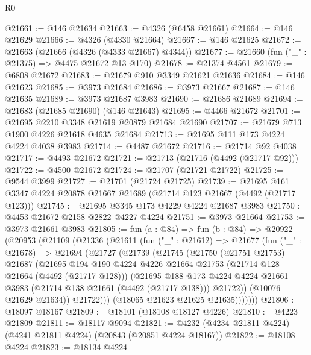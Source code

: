 \begin{lexlean}{R0}
\begin{coremodule}
@21661 := @146 @21634
@21663 := @4326 (@6458 @21661)
@21664 := @146 @21629
@21666 := @4326 (@4330 @21664)
@21667 := @146 @21625
@21672 := @21663 (@21666 (@4326 (@4333 @21667) @4344))
@21677 := @21660 (fun ("_" : @21375) => @4475 @21672 @13 @170)
@21678 := @21374 @4561
@21679 := @6808 @21672
@21683 := @21679 @910 @3349 @21621 @21636
@21684 := @146 @21623
@21685 := @3973 @21684
@21686 := @3973 @21667
@21687 := @146 @21635
@21689 := @3973 @21687 @3983
@21690 := @21686 @21689
@21694 := @21683 (@21685 @21690) (@146 @21643)
@21695 := @4466 @21672
@21701 := @21695 @2210 @3348 @21619 @20879 @21684 @21690
@21707 := @21679 @713 @1900 @4226 @21618 @4635 @21684
@21713 := @21695 @111 @173 @4224 @4224 @4038 @3983
@21714 := @4487 @21672
@21716 := @21714 @92 @4038
@21717 := @4493 @21672
@21721 := @21713 (@21716 (@4492 (@21717 @92)))
@21722 := @4500 @21672
@21724 := @21707 (@21721 @21722)
@21725 := @9544 @3999
@21727 := @21701 (@21724 @21725)
@21739 := @21695 @161 @3347 @4224 @20878 @21667 @21689 (@21714 @123 @21667 (@4492 (@21717 @123)))
@21745 := @21695 @3345 @173 @4229 @4224 @21687 @3983
@21750 := @4453 @21672 @2158 @2822 @4227 @4224
@21751 := @3973 @21664
@21753 := @3973 @21661 @3983
@21805 := fun (a : @84) =>
  fun (b : @84) =>
  @20922
    (@20953
      (@21109
        (@21336
          (@21611
            (fun ("_" : @21612) =>
            @21677
              (fun ("_" : @21678) =>
              @21694
                (@21727
                  (@21739
                    (@21745
                      (@21750
                        (@21751 @21753)
                        @21687
                        (@21695
                          @194
                          @190
                          @4224
                          @4226
                          @21664
                          @21753
                          (@21714 @128 @21664 (@4492 (@21717 @128)))
                          (@21695
                            @188
                            @173
                            @4224
                            @4224
                            @21661
                            @3983
                            (@21714 @138 @21661 (@4492 (@21717 @138)))
                            @21722))
                        (@10076 @21629 @21634))
                      @21722)))
                (@18065 @21623 @21625 @21635)))))))
@21806 := @18097 @18167
@21809 := @18101 (@18108 @18127 @4226)
@21810 := @4223 @21809
@21811 := @18117 @9094
@21821 := @4232 (@4234 @21811 @4224) (@4241 @21811 @4224) (@20843 (@20851 @4224 @18167))
@21822 := @18108 @4224
@21823 := @18134 @4224

\end{coremodule}
\end{lexlean}
